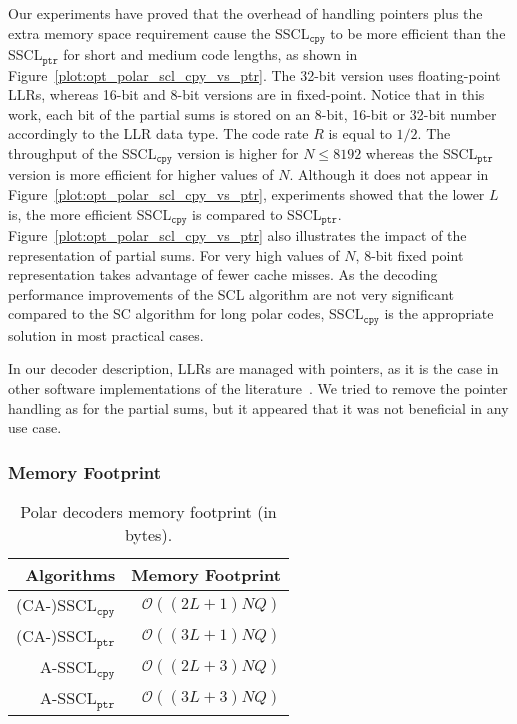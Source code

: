 Our experiments have proved that the overhead of handling pointers plus the
extra memory space requirement cause the SSCL$_{\texttt{cpy}}$ to be more
efficient than the SSCL$_{\texttt{ptr}}$ for short and medium code lengths, as
shown in Figure~\ref{plot:opt_polar_scl_cpy_vs_ptr}. The 32-bit version uses
floating-point LLRs, whereas 16-bit and 8-bit versions are in fixed-point.
Notice that in this work, each bit of the partial sums is stored on an 8-bit,
16-bit or 32-bit number accordingly to the LLR data type. The code rate $R$ is
equal to $1/2$. The throughput of the SSCL$_{\texttt{cpy}}$ version is higher
for $N \leq 8192$ whereas the SSCL$_{\texttt{ptr}}$ version is more efficient
for higher values of $N$. Although it does not appear in
Figure~\ref{plot:opt_polar_scl_cpy_vs_ptr}, experiments showed that the lower
$L$ is, the more efficient SSCL$_{\texttt{cpy}}$ is compared to
SSCL$_{\texttt{ptr}}$. Figure~\ref{plot:opt_polar_scl_cpy_vs_ptr} also
illustrates the impact of the representation of partial sums. For very high
values of $N$, 8-bit fixed point representation takes advantage of fewer cache
misses. As the decoding performance improvements of the SCL algorithm are not
very significant compared to the SC algorithm for long polar codes,
SSCL$_{\texttt{cpy}}$ is the appropriate solution in most practical cases.

In our decoder description, LLRs are managed with pointers, as it is the case in
other software implementations of the
literature~\cite{Sarkis2014b,Sarkis2016,Shen2016}. We tried to remove the
pointer handling as for the partial sums, but it appeared that it was not
beneficial in any use case.

\subsubsection{Memory Footprint}

\begin{table}[htp]
  \centering
  \caption{Polar decoders memory footprint (in bytes).}
  \label{tab:opt_polar_scl_memory_footprint}
   \begin{tabular}{r r}
    \textbf{Algorithms}        & \textbf{Memory Footprint} \\
    \hline
    \hline
    (CA-)SSCL$_{\texttt{cpy}}$ & $\mathcal{O}((2L + 1)NQ)$ \\
    (CA-)SSCL$_{\texttt{ptr}}$ & $\mathcal{O}((3L + 1)NQ)$ \\
    A-SSCL$_{\texttt{cpy}}$    & $\mathcal{O}((2L + 3)NQ)$ \\
    A-SSCL$_{\texttt{ptr}}$    & $\mathcal{O}((3L + 3)NQ)$ \\
  \end{tabular}
\end{table}


